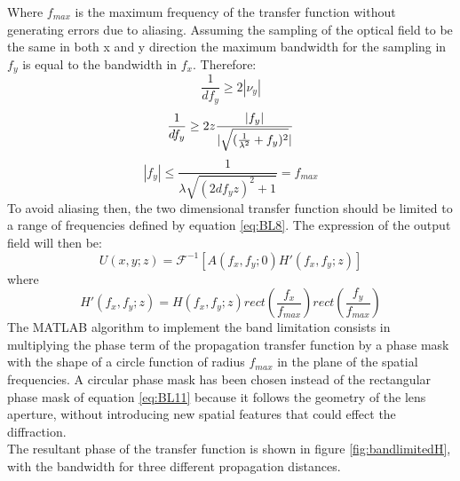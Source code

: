  Where $f_{max}$ is the maximum frequency of the transfer function without generating errors due to aliasing. Assuming the sampling of the optical field to be the same in both x and y direction the maximum bandwidth for the sampling in $f_y$ is equal to the bandwidth in $f_x $. Therefore:
 \begin{equation}
 \label{eq:BL7}
 \dfrac{1}{df_y}\geq 2|\nu_y|
 \end{equation}
 \begin{equation}
 \label{eq:BL8}
 \dfrac{1}{df_y}\geq 2 z\dfrac{|f_y|}{|\sqrt{(\frac{1}{\lambda^2}+f_y)^2}|}\\ 
 \end{equation}
 \begin{equation}
 \label{eq:BL9}
 |f_y|\leq\dfrac{1}{\lambda\sqrt{(2df_y z)^2+1}} = f_{max}
 \end{equation}
 To avoid aliasing then, the two dimensional transfer function should be limited to a range of frequencies defined by equation \ref{eq:BL8}.
 The expression of the output field will then be:
 \begin{equation}
 \label{eq:BL10}
 U(x,y;z)= \mathcal{F}^{-1}\left[A(f_x,f_y;0)H'(f_x,f_y;z)\right]
 \end{equation}
 where
 \begin{equation}
 \label{eq:BL11}
 H'(f_x,f_y;z)=H(f_x,f_y;z)rect\left(\dfrac{f_x}{f_{max}}\right)rect\left(\dfrac{f_y}{f_{max}}\right)
 \end{equation}
 The MATLAB algorithm to implement the band limitation consists in multiplying the phase term of the propagation transfer function by a phase mask with the shape of a circle function of radius $f_{max}$ in the plane of the spatial frequencies. A circular phase mask has been chosen instead of the rectangular phase mask of equation \ref{eq:BL11} because it follows the geometry of the lens aperture, without introducing new spatial features that could effect the diffraction.\\ The resultant phase of the transfer function is shown in figure \ref{fig:bandlimitedH}, with the bandwidth for three different propagation distances.
